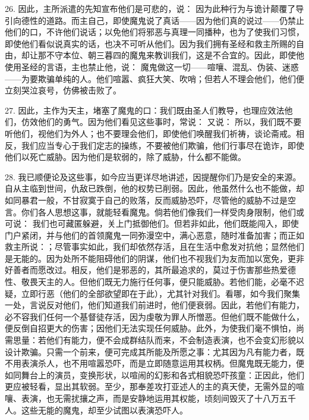 26. 因此，主所派遣的先知宣布他们是可悲的，说： 因为此种行为与诡计颠覆了导引向德性的道路。而主自己，即使魔鬼说了真话——因为他们真的说过——仍禁止他们的口，不许他们说话；以免他们将邪恶与真理一同播种，也为了使我们习惯，即使他们看似说真实的话，也决不可听从他们。因为我们拥有圣经和救主所赐的自由，却让那不守本位、朝三暮四的魔鬼来教训我们，这是不合宜的。因此，即使他使用圣经的言语，主也禁止他，说： 魔鬼做这一切——喧嚷、混乱、伪装、迷惑——为要欺骗单纯的人。他们喧嚣、疯狂大笑、吹哨；但若人不理会他们，他们便立刻哭泣哀号，仿佛被击败了。\par

27. 因此，主作为天主，堵塞了魔鬼的口：我们既由圣人们教导，也理应效法他们，仿效他们的勇气。因为他们看见这些事时，常说： 又说： 所以，我们既不要听他们，视他们为外人；也不要理会他们，即使他们唤醒我们祈祷，谈论斋戒。相反，我们应当专心于我们定志的操练，不要被他们欺骗，他们行事尽在诡诈，即使他们以死亡威胁。因为他们是软弱的，除了威胁，什么都不能做。\par

28. 我已顺便论及这些事，如今应当更详尽地讲述，因提醒你们乃是安全的来源。自从主临到世间，仇敌已跌倒，他的权势已削弱。因此，他虽然什么也不能做，却如同暴君一般，不甘寂寞于自己的败落，反而威胁恐吓，尽管他的威胁不过是空言。你们各人思想这事，就能轻看魔鬼。倘若他们像我们一样受肉身限制，他们或可说： 我们也可藏匿躲避，关上门抵御他们。但若非如此，他们既能闯入，即使门户紧闭，并与他们的首领魔鬼一同弥漫空中，满心恶意，随时准备加害；而正如救主所说：；尽管事实如此，我们却依然存活，且在生活中愈发对抗他；显然他们是无能的。因为处所不能阻碍他们的阴谋，他们也不视我们为友而加以宽免，更非好善者而愿改过。相反，他们是邪恶的，其所最追求的，莫过于伤害那些热爱德性、敬畏天主的人。但他们既无力施行任何事，便只能威胁。若他们能，必毫不迟疑，立即行恶（他们的全部欲望即在于此），尤其针对我们。看哪，如今我们聚集一处，言说反对他们，他们知道我们前进时，他们便衰弱。因此，若他们有能力，必不容我们任何一个基督徒存活，因为虔敬为罪人所憎恶。但他们既不能做什么，便反倒自招更大的伤害；因他们无法实现任何威胁。此外，为使我们毫不惧怕，尚需思量：若他们有能力，便不会成群结队而来，不会制造表演，也不会变幻形貌以设计欺骗。只需一个前来，便可完成其所能及所愿之事：尤其因为凡有能力者，既不用表演杀人，也不用喧嚣恐吓，而是立即随意运用其权柄。但魔鬼既无能力，便如同舞台上的演员，变换形状，以喧闹的幻影和各式相貌恐吓孩童：正因此，他们更应被轻看，显出其软弱。至少，那奉差攻打亚述人的主的真天使，无需外显的喧嚷、表演，也无需扰攘之声，而是安静地运用其权能，顷刻间毁灭了十八万五千人。这些无能的魔鬼，却至少试图以表演恐吓人。\par

